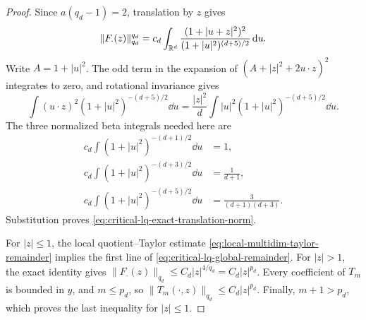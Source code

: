 \begin{proof}
Since \(a(q_d-1)=2\), translation by \(z\) gives
\[
 \|F_\cdot(z)\|_{q_d}^{q_d}
 =c_d\int_{\mathbb{R}^d}
 \frac{(1+|u+z|^2)^2}{(1+|u|^2)^{(d+5)/2}}\,\mathrm{d} u.
\]
Write \(A=1+|u|^2\).  The odd term in the expansion of
\((A+|z|^2+2u\cdot z)^2\) integrates to zero, and rotational invariance
gives
\[
 \int(u\cdot z)^2(1+|u|^2)^{-(d+5)/2}\dd u
 =\frac{|z|^2}{d}\int |u|^2(1+|u|^2)^{-(d+5)/2}\dd u.
\]
The three normalized beta integrals needed here are
\[
 \begin{aligned}
 c_d\int(1+|u|^2)^{-(d+1)/2}\dd u&=1,\\
 c_d\int(1+|u|^2)^{-(d+3)/2}\dd u&=\frac1{d+1},\\
 c_d\int(1+|u|^2)^{-(d+5)/2}\dd u
 &=\frac3{(d+1)(d+3)}.
 \end{aligned}
\]
Substitution proves \eqref{eq:critical-lq-exact-translation-norm}.

For \(|z|\le1\), the local quotient--Taylor estimate
\eqref{eq:local-multidim-taylor-remainder} implies the first line of
\eqref{eq:critical-lq-global-remainder}.  For \(|z|>1\), the exact identity
gives \(\|F_\cdot(z)\|_{q_d}\le C_d|z|^{4/q_d}=C_d|z|^{p_d}\).
Every coefficient of \(T_m\) is bounded in \(y\), and \(m\le p_d\), so
\(\|T_m(\cdot,z)\|_{q_d}\le C_d|z|^{p_d}\).  Finally,
\(m+1>p_d\), which proves the last inequality for \(|z|\le1\).
\end{proof}

